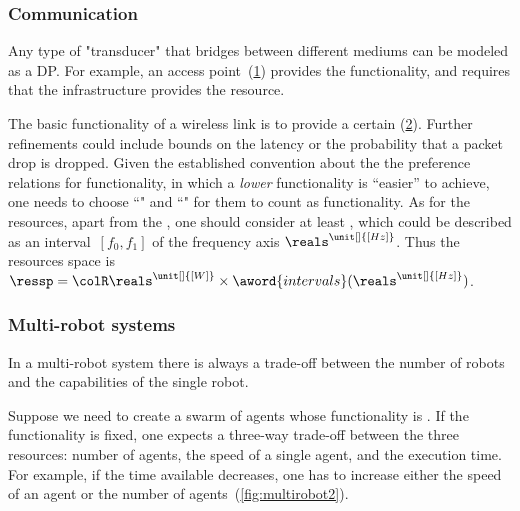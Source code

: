 \subsubsection{Communication}

\begin{example}[Transducers]
    Any type of "transducer" that bridges between different mediums can be modeled as a DP.
    For example, an access point~(\cref{fig:accesspoint}) provides the  functionality, and requires that the infrastructure provides the  resource.
\end{example}

\begin{figure}[h]
    \centering
    \caption{}
    \label{fig:accesspoint}
\end{figure}

\begin{example}
    The basic functionality of a wireless link is to provide a certain  (\cref{fig:networklink}).
    Further refinements could include bounds on the latency or the probability that a packet drop is dropped.
    Given the established convention about the the preference relations for functionality, in which a \emph{lower} functionality is ``easier'' to achieve, one needs to choose ``" and ``" for them to count as functionality.
    As for the resources, apart from the , one should consider at least , which could be described as an interval~$[f_0,f_1]$ of the frequency axis $\reals^{\unit[]{[Hz]}}$.
    Thus the resources space is $\ressp=\colR\reals^{\unit[]{[W]}}\times\aword{intervals}(\reals^{\unit[]{[Hz]}})$.
\end{example}
\begin{figure}[h]
    \centering
    \caption{ }
    \label{fig:networklink}
\end{figure}

\subsubsection{Multi-robot systems}

In a multi-robot system there is always a trade-off between the number of robots and the capabilities of the single robot.
\begin{example}
    Suppose we need to create a swarm of agents whose functionality is
    .
    If the functionality is fixed, one expects a three-way trade-off between the three resources: number of agents, the speed of a single agent, and the execution time.
    For example, if the time available decreases, one has to increase either the speed of an agent or the number of agents~(\cref{fig:multirobot2}).
\end{example}


